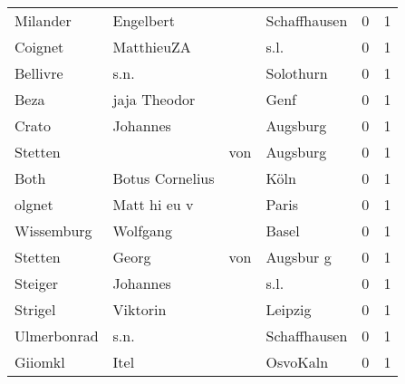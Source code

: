 \documentclass[10pt,a4paper,landscape]{article}
\begin{document}
\begin{longtable}{llllrr}
                 Milander &                          Engelbert &             &                                Schaffhausen &          0 &         1 \\
                  Coignet &                         MatthieuZA &             &                                        s.l. &          0 &         1 \\
                 Bellivre &                               s.n. &             &                                   Solothurn &          0 &         1 \\
                     Beza &                       jaja Theodor &             &                                        Genf &          0 &         1 \\
                    Crato &                           Johannes &             &                                    Augsburg &          0 &         1 \\
                  Stetten &                                    &         von &                                    Augsburg &          0 &         1 \\
                     Both &                    Botus Cornelius &             &                                        Köln &          0 &         1 \\
                   olgnet &                       Matt hi eu v &             &                                       Paris &          0 &         1 \\
               Wissemburg &                           Wolfgang &             &                                       Basel &          0 &         1 \\
                  Stetten &                              Georg &         von &                                   Augsbur g &          0 &         1 \\
                  Steiger &                           Johannes &             &                                        s.l. &          0 &         1 \\
                  Strigel &                           Viktorin &             &                                     Leipzig &          0 &         1 \\
              Ulmerbonrad &                               s.n. &             &                                Schaffhausen &          0 &         1 \\
                  Giiomkl &                               Itel &             &                                    OsvoKaln &          0 &         1 \\

\end{longtable}
\end{document}
